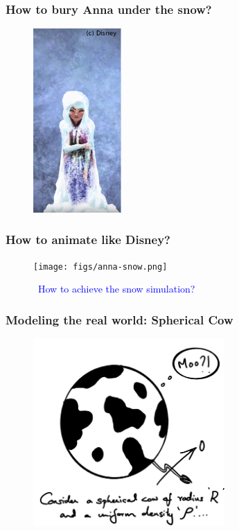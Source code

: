 \documentclass[notes]{beamer}
\begin{document}
\begin{frame}
\frametitle{How to bury Anna under the snow?}
	\begin{figure}[ht]
		\centering
		\includegraphics[width=0.3\textwidth]{figs/anna-in-snow.png}
	\end{figure}
\end{frame}

\begin{frame}
	\frametitle{How to animate like Disney?}
	\begin{figure}[ht]
		\centering
		\texttt{[image: figs/anna-snow.png]}
		\caption*{\textcolor{blue}{\faCommentsO ~How to achieve the snow simulation?}}
	\end{figure}
\end{frame}

\begin{frame}
	\frametitle{Modeling the real world: Spherical Cow}
	\begin{figure}[ht]
		\centering
		\includegraphics[width=0.65\textwidth]{figs/spherical-cow.png}
	\end{figure}
\end{frame}
\end{document}
